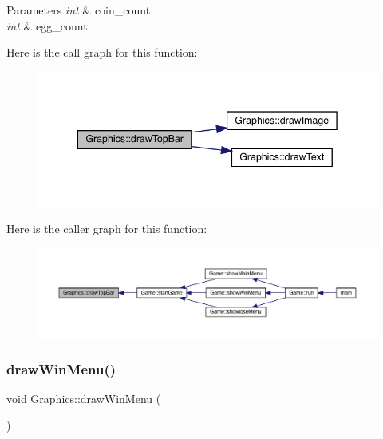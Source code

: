 \begin{DoxyParams}{Parameters}
{\em int} & coin\+\_\+count \\
\hline
{\em int} & egg\+\_\+count \\
\hline
\end{DoxyParams}
Here is the call graph for this function\+:\nopagebreak
\begin{figure}[H]
\begin{center}
\leavevmode
\includegraphics[width=342pt]{class_graphics_a91331c794ba21a860e8137b25df855dc_cgraph}
\end{center}
\end{figure}
Here is the caller graph for this function\+:
\nopagebreak
\begin{figure}[H]
\begin{center}
\leavevmode
\includegraphics[width=350pt]{class_graphics_a91331c794ba21a860e8137b25df855dc_icgraph}
\end{center}
\end{figure}
\mbox{\label{class_graphics_ae8619c9c1de576df13861512024d7867}} 
\subsubsection{\texorpdfstring{draw\+Win\+Menu()}{drawWinMenu()}}
{\footnotesize\ttfamily void Graphics\+::draw\+Win\+Menu (\begin{DoxyParamCaption}{ }\end{DoxyParamCaption})}



